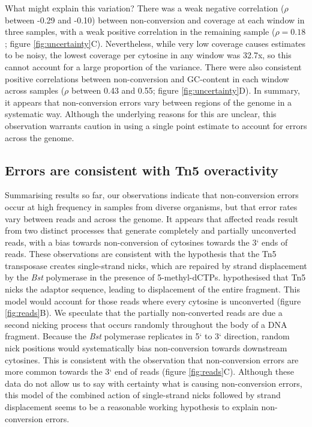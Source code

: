 \documentclass[twocolumn,twoside,lettersize]{article}
\begin{document}
What might explain this variation?
There was a weak negative correlation ($\rho$ between -0.29 and -0.10) between non-conversion and coverage at each window in three samples, with a weak positive correlation in the remaining sample ($\rho = 0.18$; figure \ref{fig:uncertainty}C).
Nevertheless, while very low coverage causes estimates to be noisy, the lowest coverage per cytosine in any window was 32.7x, so this cannot account for a large proportion of the variance.
There were also consistent positive correlations between non-conversion and GC-content in each window across samples ($\rho$ between 0.43 and 0.55; figure \ref{fig:uncertainty}D).
In summary, it appears that non-conversion errors vary between regions of the genome in a systematic way.
Although the underlying reasons for this are unclear, this observation warrants caution in using a single point estimate to account for errors across the genome.

\subsection{Errors are consistent with Tn5 overactivity}

Summarising results so far, our observations indicate that non-conversion errors occur at high frequency in samples from diverse organisms, but that error rates vary between reads and across the genome.
It appears that affected reads result from two distinct processes that generate completely and partially unconverted reads, with a bias towards non-conversion of cytosines towards the 3` ends of reads.
These observations are consistent with the hypothesis that the Tn5 transposase creates single-strand nicks, which are repaired by strand displacement by the \textit{Bst} polymerase in the presence of 5-methyl-dCTPs.
\textcite{lu2015improved} hypothesised that Tn5 nicks the adaptor sequence, leading to displacement of the entire fragment.
This model would account for those reads where every cytosine is unconverted (figure \ref{fig:reads}B).
We speculate that the partially non-converted reads are due a second nicking process that occurs randomly throughout the body of a DNA fragment.
Because the \textit{Bst} polymerase replicates in 5` to 3` direction, random nick positions would systematically bias non-conversion towards downstream cytosines.
This is consistent with the observation that non-conversion errors are more common towards the 3` end of reads (figure \ref{fig:reads}C).
Although these data do not allow us to say with certainty what is causing non-conversion errors, this model of the combined action of single-strand nicks followed by strand displacement seems to be a reasonable working hypothesis to explain non-conversion errors.
\end{document}
